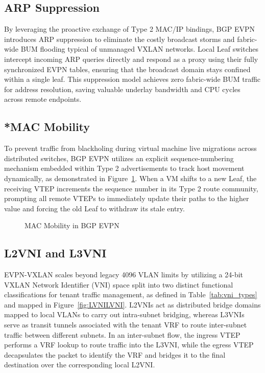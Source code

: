\subsection*{ARP Suppression}
By leveraging the proactive exchange of Type 2 MAC/IP bindings, BGP EVPN introduces ARP suppression to eliminate the costly broadcast storms and fabric-wide BUM flooding typical of unmanaged VXLAN networks. Local Leaf switches intercept incoming ARP queries directly and respond as a proxy using their fully synchronized EVPN tables, ensuring that the broadcast domain stays confined within a single leaf. This suppression model achieves zero fabric-wide BUM traffic for address resolution, saving valuable underlay bandwidth and CPU cycles across remote endpoints.

\subsection{*MAC Mobility}
To prevent traffic from blackholing during virtual machine live migrations across distributed switches, BGP EVPN utilizes an explicit sequence-numbering mechanism embedded within Type 2 advertisements to track host movement dynamically, as demonstrated in Figure~\ref{fig:MACmobility}. When a VM shifts to a new Leaf, the receiving VTEP increments the sequence number in its Type 2 route community, prompting all remote VTEPs to immediately update their paths to the higher value and forcing the old Leaf to withdraw its stale entry.

\begin{figure}[!htbp]
        \centering
        \MACmobility
        \caption{MAC Mobility in BGP EVPN}
        \label{fig:MACmobility}
\end{figure}

\subsection*{L2VNI and L3VNI}
EVPN-VXLAN scales beyond legacy 4096 VLAN limits by utilizing a 24-bit VXLAN Network Identifier (VNI) space split into two distinct functional classifications for tenant traffic management, as defined in Table~\ref{tab:vni_types} and mapped in Figure~\ref{fig:LVNILVNI}. L2VNIs act as distributed bridge domains mapped to local VLANs to carry out intra-subnet bridging, whereas L3VNIs serve as transit tunnels associated with the tenant VRF to route inter-subnet traffic between different subnets. In an inter-subnet flow, the ingress VTEP performs a VRF lookup to route traffic into the L3VNI, while the egress VTEP decapsulates the packet to identify the VRF and bridges it to the final destination over the corresponding local L2VNI\cite{IETFRFC8365}.

